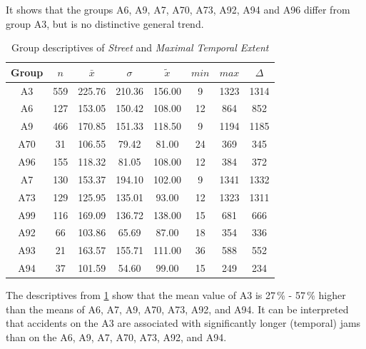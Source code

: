 It shows that the groups A6, A9, A7, A70, A73, A92, A94 and A96 differ from group A3, but is no distinctive general trend.
\begin{table}[ht!]
	\tiny
	\centering
	\begin{tabular}{c|c|c|c|c|c|c|c}
		\toprule
		Group & $n$ & $\bar{x}$ & $\sigma$ & $\tilde{x}$ & $min$ & $max$ & $\Delta$ \\ 
		\midrule
		A3  & 559 & 225.76 & 210.36 & 156.00 & 9  & 1323 & 1314 \\ 
		A6  & 127 & 153.05 & 150.42 & 108.00 & 12 & 864  & 852  \\ 
		A9  & 466 & 170.85 & 151.33 & 118.50 & 9  & 1194 & 1185 \\ 
		A70 & 31  & 106.55 & 79.42  & 81.00  & 24 & 369  & 345  \\ 
		A96 & 155 & 118.32 & 81.05  & 108.00 & 12 & 384  & 372  \\ 
		A7  & 130 & 153.37 & 194.10 & 102.00 & 9  & 1341 & 1332 \\ 
		A73 & 129 & 125.95 & 135.01 & 93.00  & 12 & 1323 & 1311 \\ 
		A99 & 116 & 169.09 & 136.72 & 138.00 & 15 & 681  & 666  \\ 
		A92 & 66  & 103.86 & 65.69  & 87.00  & 18 & 354  & 336  \\ 
		A93 & 21  & 163.57 & 155.71 & 111.00 & 36 & 588  & 552  \\ 
		A94 & 37  & 101.59 & 54.60  & 99.00  & 15 & 249  & 234  \\ 
 		\bottomrule
	\end{tabular}
	\caption{Group descriptives of \textit{Street} and \textit{Maximal Temporal Extent}}
	\label{tbl:descriptives_baysis_matched_Str_TMax}
\end{table}
The descriptives from \cref{tbl:descriptives_baysis_matched_Str_TMax} show that the mean value of A3 is 27\,\% - 57\,\% higher than the means of A6, A7, A9, A70, A73, A92, and A94. It can be interpreted that accidents on the A3 are associated with significantly longer (temporal) jams than on the A6, A9, A7, A70, A73, A92, and A94.

